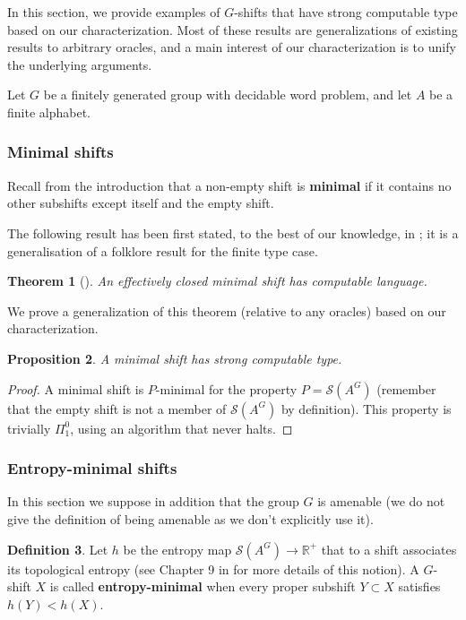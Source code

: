 \documentclass[french,american]{article}
\theoremstyle{plain}
\newtheorem{theorem}{Theorem}[section]
\newtheorem{proposition}[theorem]{Proposition}
\theoremstyle{definition}
\newtheorem{definition}[theorem]{Definition}
\theoremstyle{remark}
\theoremstyle{plain}
\begin{document}
In this section, we provide examples of $G$-shifts that have strong
computable type based on our characterization. Most of these results are generalizations of existing results to arbitrary oracles, and a main interest of our characterization is to unify the underlying arguments.

Let $G$ be a finitely generated group with decidable word problem,
and let $A$ be a finite alphabet.

\subsubsection{Minimal shifts}\label{subsec:Minimal-subshifts}

Recall from the introduction that a non-empty shift is \textbf{minimal}
if it contains no other subshifts except itself and the empty shift.

The following result has been first stated, to the best of our knowledge,
in \cite{delvenneblondel}; it is a generalisation of a folklore result
for the finite type case.
\begin{theorem}[\cite{delvenneblondel}]
 An effectively closed minimal shift has computable language.
\end{theorem}

We prove a generalization of this theorem (relative to any oracles) based on our characterization.


\begin{proposition}
A minimal shift has strong computable type.
\end{proposition}

\begin{proof}
A minimal shift is $P$-minimal for the property $P=\mathcal S(A^G)$ (remember that the empty shift is not a member of $\mathcal S(A^G)$ by definition). This property is trivially $\Pi_1^0$, using an algorithm that never halts.
\end{proof}



\subsubsection{Entropy-minimal shifts}\label{subsec:Entropy-minimal-subshifts}

In this section we suppose in addition that the group $G$ is amenable
(we do not give the definition of being amenable as we don't explicitly
use it).
\begin{definition}
\label{def:hentropyminimal}Let $h$ be the entropy
map $\mathcal{S}(A^{G})\rightarrow\mathbb{R}^+$ that to a shift
associates its topological entropy (see Chapter 9 in \cite{kerr2017ergodic}
for more details of this notion). A $G$-shift
$X$ is called \textbf{entropy-minimal}
when every proper subshift $Y\subset X$ satisfies $h(Y)<h(X)$.
\end{definition}
\end{document}
